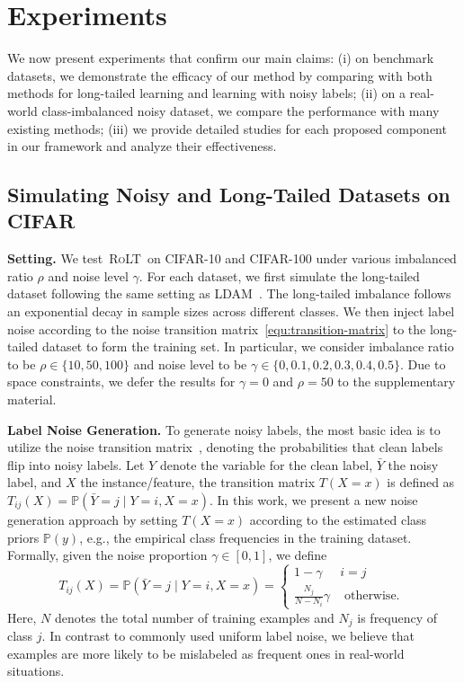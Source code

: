 \documentclass{article}
\def\algo{{\textsc{RoLT}}}
\begin{document}
\section{Experiments}
We now present experiments that confirm our main claims: (i) on benchmark datasets, we demonstrate the efficacy of our method by comparing with both methods for long-tailed learning and learning with noisy labels; (ii) on a real-world class-imbalanced noisy dataset, we compare the performance with many existing methods; (iii) we provide detailed studies for each proposed component in our framework and analyze their effectiveness.

\subsection{Simulating Noisy and Long-Tailed Datasets on CIFAR}
\textbf{Setting.} We test~\algo~on CIFAR-10 and CIFAR-100 under various imbalanced ratio $\rho$ and noise level $\gamma$. For each dataset, we first simulate the long-tailed dataset following the same setting as LDAM~\cite{DBLP:conf/nips/CaoWGAM19ldam}. The long-tailed imbalance follows an exponential decay in sample sizes across different classes. We then inject label noise according to the noise transition matrix~\eqref{equ:transition-matrix} to the long-tailed dataset to form the training set. In particular, we consider imbalance ratio to be $\rho \in \{10, 50, 100\}$ and noise level to be $\gamma \in \{0, 0.1, 0.2, 0.3, 0.4, 0.5\}$. Due to space constraints, we defer the results for $\gamma = 0$ and $\rho = 50$ to the supplementary material. 


\textbf{Label Noise Generation.}
To generate noisy labels, the most basic idea is to utilize the noise transition matrix~\cite{liu2016importance}, denoting the probabilities that clean labels flip into noisy labels. Let $Y$ denote the variable for the clean label, $\bar{Y}$ the noisy label, and $X$ the instance/feature, the transition matrix $T(X = x)$ is defined as $T_{ij}(X) = \mathbb{P}(\bar{Y}=j \mid Y=i, X=x)$. In this work, we present a new noise generation approach by setting $T(X = x)$ according to the estimated class priors $\mathbb{P}(y)$, e.g., the empirical class frequencies in the training dataset. Formally, given the noise proportion $\gamma \in [0,1]$, we define
\begin{equation}\label{equ:transition-matrix}
    T_{ij}(X) = \mathbb{P}(\bar{Y}=j \mid Y=i, X=x) = \left\{\begin{array}{ll}
1 - \gamma  & i = j \\
\frac{N_j}{N - N_i} \gamma & \text { otherwise. }
\end{array}\right.
\end{equation}
Here, $N$ denotes the total number of training examples and $N_j$ is frequency of class $j$. In contrast to commonly used uniform label noise, we believe that examples are more likely to be mislabeled as frequent ones in real-world situations.
\end{document}
